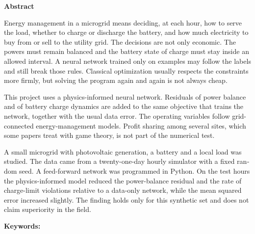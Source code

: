 \thispagestyle{empty}
\begin{latin}
\sloppy
{}
{\bfseries\fontsize{20pt}{28pt}\selectfont Abstract\par}
\vspace{1.1cm}

Energy management in a microgrid means deciding, at each hour, how to serve the load, whether to charge or discharge the battery, and how much electricity to buy from or sell to the utility grid. The decisions are not only economic. The powers must remain balanced and the battery state of charge must stay inside an allowed interval. A neural network trained only on examples may follow the labels and still break those rules. Classical optimization usually respects the constraints more firmly, but solving the program again and again is not always cheap.

This project uses a physics-informed neural network. Residuals of power balance and of battery charge dynamics are added to the same objective that trains the network, together with the usual data error. The operating variables follow grid-connected energy-management models. Profit sharing among several sites, which some papers treat with game theory, is not part of the numerical test.

A small microgrid with photovoltaic generation, a battery and a local load was studied. The data came from a twenty-one-day hourly simulator with a fixed random seed. A feed-forward network was programmed in Python. On the test hours the physics-informed model reduced the power-balance residual and the rate of charge-limit violations relative to a data-only network, while the mean squared error increased slightly. The finding holds only for this synthetic set and does not claim superiority in the field.

\vspace{0.6cm}
\noindent\textbf{Keywords:} \KeywordsEn
\end{latin}
